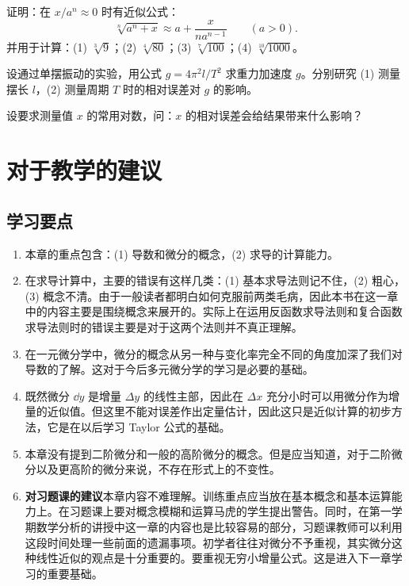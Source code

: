 \begin{xexercise}[3]
证明：在 $x/a^n\approx0$ 时有近似公式：
  \[
    \sqrt[n]{a^n+x}\approx a+\frac{x}{na^{n-1}}\qquad(a>0).
  \]
  并用于计算：(1) $\sqrt[3]{9}$；(2) $\sqrt[4]{80}$；(3) $\sqrt[7]{100}$；(4) $\sqrt[10]{1000}$。
\end{xexercise}

\begin{xexercise}[4]
设通过单摆振动的实验，用公式 $g=4\pi^2l/T^2$ 求重力加速度 $g$。分别研究 (1) 测量摆长 $l$，(2) 测量周期 $T$ 时的相对误差对 $g$ 的影响。
\end{xexercise}

\begin{xexercise}[5]
设要求测量值 $x$ 的常用对数，问：$x$ 的相对误差会给结果带来什么影响？
\end{xexercise}


\section{对于教学的建议}

\subsection{学习要点}

\begin{enumerate}
  \item 本章的重点包含：(1) 导数和微分的概念，(2) 求导的计算能力。
  \item 在求导计算中，主要的错误有这样几类：(1) 基本求导法则记不住，(2) 粗心，(3) 概念不清。由于一般读者都明白如何克服前两类毛病，因此本书在这一章中的内容主要是围绕概念来展开的。实际上在运用反函数求导法则和复合函数求导法则时的错误主要是对于这两个法则并不真正理解。
  \item 在一元微分学中，微分的概念从另一种与变化率完全不同的角度加深了我们对导数的了解。这对于今后多元微分学的学习是必要的基础。
  \item 既然微分 $\dd y$ 是增量 $\Delta y$ 的线性主部，因此在 $\Delta x$ 充分小时可以用微分作为增量的近似值。但这里不能对误差作出定量估计，因此这只是近似计算的初步方法，它是在以后学习 Taylor 公式的基础。
  \item 本章没有提到二阶微分和一般的高阶微分的概念。但是应当知道，对于二阶微分以及更高阶的微分来说，不存在形式上的不变性。
  \item \textbf{对习题课的建议}\quad 本章内容不难理解。训练重点应当放在基本概念和基本运算能力上。在习题课上要对概念模糊和运算马虎的学生提出警告。同时，在第一学期数学分析的讲授中这一章的内容也是比较容易的部分，习题课教师可以利用这段时间处理一些前面的遗漏事项。初学者往往对微分不予重视，其实微分这种线性近似的观点是十分重要的。要重视无穷小增量公式。这是进入下一章学习的重要基础。
\end{enumerate}

